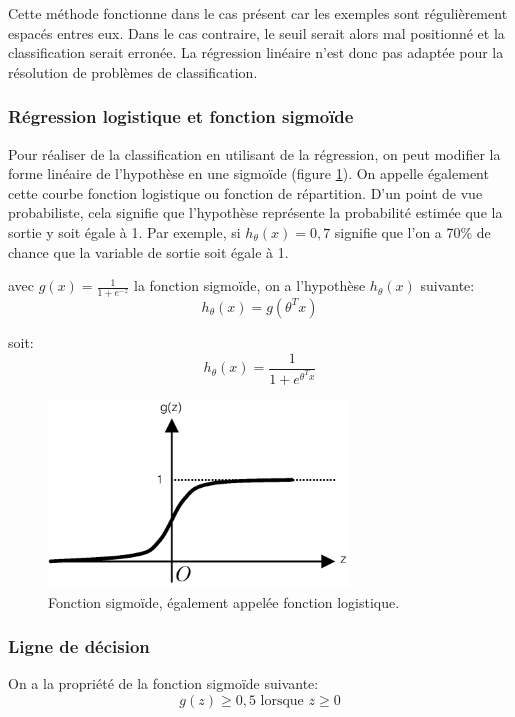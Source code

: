 Cette méthode fonctionne dans le cas présent car les exemples sont régulièrement espacés entres eux. Dans le cas contraire, le seuil serait alors mal positionné et la classification serait erronée. La régression linéaire n'est donc pas adaptée pour la résolution de problèmes de classification. 

\subsubsection{Régression logistique et fonction sigmoïde}
\label{Le Machine Learning: Les différents algorithmes: La regression logistique: Régression logistique et fonction sigmoïde}
Pour réaliser de la classification en utilisant de la régression,  on peut modifier la forme linéaire de l'hypothèse en une sigmoïde (figure \ref{fig:Fonction sigmoïde}). On appelle également cette courbe fonction logistique ou fonction de répartition. D'un point de vue probabiliste, cela signifie que l'hypothèse représente la probabilité estimée que la sortie y soit égale à 1. Par exemple, si $h_\theta(x)=0,7$ signifie que l'on a 70\% de chance que la variable de sortie soit égale à 1.  

avec $g(x) = \frac{1}{1 + e^{-z}}$  la fonction sigmoïde, on a l'hypothèse $h_\theta(x)$ suivante: 
\begin{equation}
	h_\theta(x)=g(\theta^Tx) 
\end{equation}

soit: 
\begin{equation}
h_\theta(x)=\frac{1}{1 + e^{\theta^Tx}} 
\end{equation}

\begin{figure}[h]
	\centering\includegraphics[height=5cm]{images/sigmoid.png}
	\caption[Fonction sigmoïde]{Fonction sigmoïde, également appelée fonction logistique.}
	\label{fig:Fonction sigmoïde}
\end{figure}

\subsubsection{Ligne de décision}
\label{Le Machine Learning: Les différents algorithmes: La regression logistique: Ligne de décision}
On a la propriété de la fonction sigmoïde suivante: 
\begin{equation}
 g(z) \ge 0,5 \text{ lorsque } z \ge 0
\end{equation}


